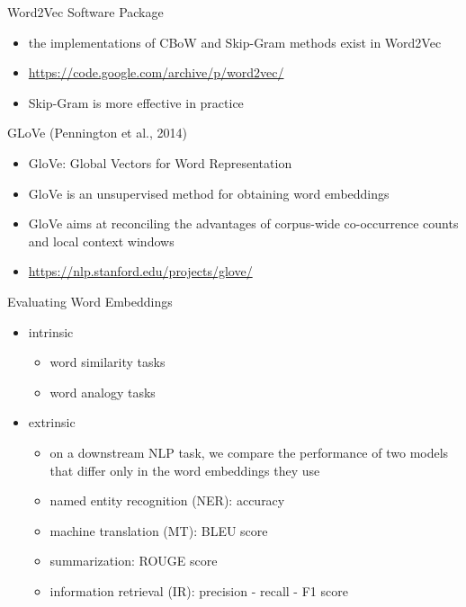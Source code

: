 \begin{frame}{Word2Vec Software Package}
    \begin{itemize}
        \item<1-> the implementations of CBoW and Skip-Gram methods exist in Word2Vec
        \item<1-> \url{https://code.google.com/archive/p/word2vec/}
        \item<2-> Skip-Gram is more effective in practice
    \end{itemize}
\end{frame}
\begin{frame}{GLoVe (Pennington et al., 2014)}\begin{itemize}
    \item GloVe: Global Vectors for Word Representation
    \item GloVe is an unsupervised method for obtaining word embeddings
    \item GloVe aims at reconciling the advantages of corpus-wide co-occurrence counts and local context windows
    \item \url{https://nlp.stanford.edu/projects/glove/}
\end{itemize}
\end{frame}
\begin{frame}{Evaluating Word Embeddings}
\begin{itemize}
     \item<1-> intrinsic
     \begin{itemize}
         \item<2-> word similarity tasks
         \item<2-> word analogy tasks
     \end{itemize}
     \item<3-> extrinsic
     \begin{itemize}
        \item<4-> on a downstream NLP task, we compare the performance of two models that differ only in the word embeddings they use
         \item<5-> named entity recognition (NER): accuracy
         \item<6-> machine translation (MT): BLEU score
         \item<7-> summarization: ROUGE score
         \item<8-> information retrieval (IR): precision - recall - F1 score
     \end{itemize}
\end{itemize}
 \end{frame}
